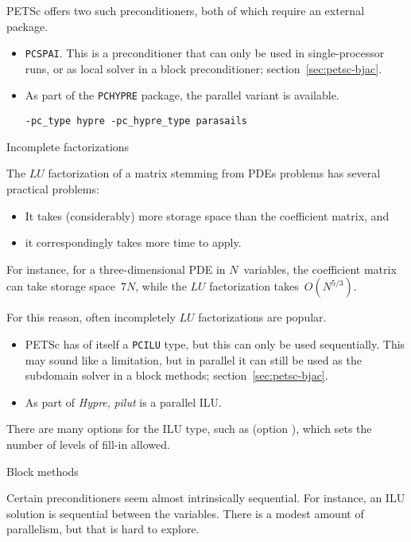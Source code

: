 PETSc offers two such preconditioners, both of which require an external package.
\begin{itemize}
\item \lstinline{PCSPAI}. This is a preconditioner that can only be
  used in single-processor runs, or as local solver in a block
  preconditioner; section~\ref{sec:petsc-bjac}.
\item As part of the \lstinline{PCHYPRE} package, the parallel variant
   is available.
\begin{verbatim}
-pc_type hypre -pc_hypre_type parasails
\end{verbatim}
\end{itemize}

 {Incomplete factorizations}

The $LU$ factorization of a matrix stemming from \acp{PDE} problems
has several practical problems:
\begin{itemize}
\item It takes (considerably) more storage space than the coefficient matrix, and
\item it correspondingly takes more time to apply.
\end{itemize}
For instance, for a three-dimensional \ac{PDE} in $N$~variables, the coefficient matrix
can take storage space~$7N$, while the $LU$ factorization takes~$O(N^{5/3})$.

For this reason, often incompletely $LU$ factorizations are popular.
\begin{itemize}
\item PETSc has of itself a \lstinline{PCILU} type, but this can only be used sequentially.
  This may sound like a limitation, but in parallel it can still be used as the
  subdomain solver in a block methods; section~\ref{sec:petsc-bjac}.
\item As part of \emph{Hypre}, \emph{pilut} is a parallel ILU.
\end{itemize}

There are many options for the ILU type, such as
(option ),
which sets the number of levels of fill-in allowed.

 {Block methods}
\label{sec:petsc-bjac}

Certain preconditioners seem almost intrinsically sequential.
For instance, an ILU solution is sequential between the variables.
There is a modest amount of parallelism, but that is hard to explore.

